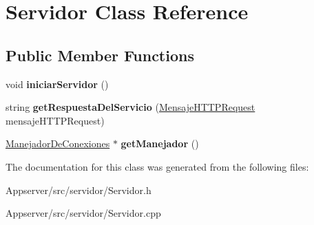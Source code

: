 \hypertarget{classServidor}{}\section{Servidor Class Reference}
\label{classServidor}
\subsection*{Public Member Functions}
\begin{DoxyCompactItemize}
\item 
void {\bfseries iniciar\+Servidor} ()\hypertarget{classServidor_a8e8233fd578ffe08c580ee8da690070a}{}\label{classServidor_a8e8233fd578ffe08c580ee8da690070a}

\item 
string {\bfseries get\+Respuesta\+Del\+Servicio} (\hyperlink{classMensajeHTTPRequest}{Mensaje\+H\+T\+T\+P\+Request} mensaje\+H\+T\+T\+P\+Request)\hypertarget{classServidor_ae7515cd10278407c663f60a50ff280b3}{}\label{classServidor_ae7515cd10278407c663f60a50ff280b3}

\item 
\hyperlink{classManejadorDeConexiones}{Manejador\+De\+Conexiones} $\ast$ {\bfseries get\+Manejador} ()\hypertarget{classServidor_a1d2c7b487179dbe30d24ccd8ab2caf4e}{}\label{classServidor_a1d2c7b487179dbe30d24ccd8ab2caf4e}

\end{DoxyCompactItemize}


The documentation for this class was generated from the following files\+:\begin{DoxyCompactItemize}
\item 
Appserver/src/servidor/Servidor.\+h\item 
Appserver/src/servidor/Servidor.\+cpp\end{DoxyCompactItemize}
